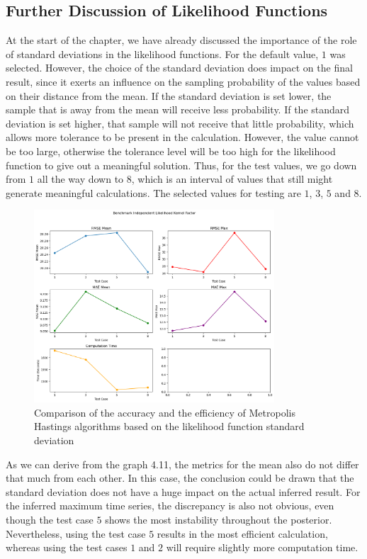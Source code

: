 \subsection{Further Discussion of Likelihood Functions}
At the start of the chapter, we have already discussed the importance of the role of standard deviations in the likelihood functions. For the default value, $1$ was selected. However, the choice of the standard deviation does impact on the final result, since it exerts an influence on the sampling probability of the values based on their distance from the mean. If the standard deviation is set lower, the sample that is away from the mean will receive less probability. If the standard deviation is set higher, that sample will not receive that little probability, which allows more tolerance to be present in the calculation. However, the value cannot be too large, otherwise the tolerance level will be too high for the likelihood function to give out a meaningful solution. Thus, for the test values, we go down from $1$ all the way down to $8$, which is an interval of values that still might generate meaningful calculations. The selected values for testing are $1$, $3$, $5$ and $8$. 

\begin{figure}
    \centering
    \includegraphics[width=0.8\textwidth]{figures/basic_mh/benchmark/sensitivity_likelihood_independent.png}
    \captionsetup{width=.8\textwidth}
    \caption{Comparison of the accuracy and the efficiency of Metropolis Hastings algorithms based on the likelihood function standard deviation}
    \label{fig:enter-label}
\end{figure}


As we can derive from the graph 4.11, the metrics for the mean also do not differ that much from each other. In this case, the conclusion could be drawn that the standard deviation does not have a huge impact on the actual inferred result. For the inferred maximum time series, the discrepancy is also not obvious, even though the test case $5$ shows the most instability throughout the posterior. Nevertheless, using the test case $5$ results in the most efficient calculation, whereas using the test cases $1$ and $2$ will require slightly more computation time.

